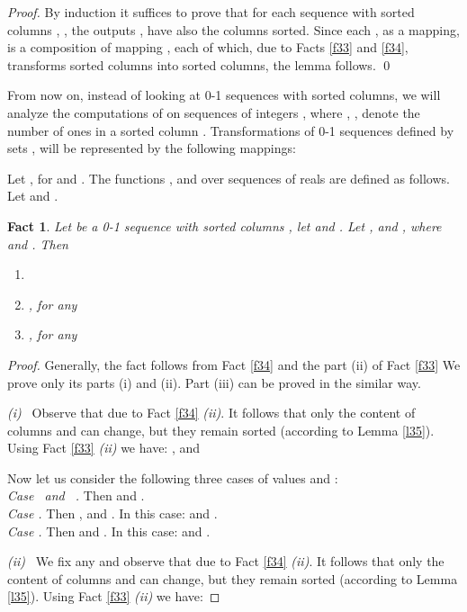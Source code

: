 \documentclass{llncs}
\newtheorem{fact}[theorem]{Fact}
\begin{document}
\begin{proof} By induction it suffices to prove that for each sequence
   with sorted columns , , the
  outputs ,  have also the columns sorted. Since
  each , as a mapping, is a composition of mapping , each of which, due to Facts 
  \ref{f33} and \ref{f34}, transforms sorted columns into sorted columns, the
  lemma follows. \qed
\end{proof}
From now on, instead of looking at 0-1 sequences with sorted columns, we
will analyze the computations of  on sequences of integers
, where , ,
denote the number of ones in a sorted column . Transformations of
0-1 sequences defined by sets ,  will be
represented by the following mappings:
\begin{definition} \label{defFun}
Let ,  for  and
. The functions ,  and  over
sequences of  reals are defined as follows. Let
 and .

\end{definition}
\begin{fact} \label{f6}
Let  be a 0-1 sequence with sorted columns , let  and . Let , 
  and , where
   and . Then
\begin{enumerate}
\item[(i)] 
\item[(ii)] , for any
  
\item[(iii)] , for any
  
\end{enumerate}
\end{fact}
\begin{proof} Generally, the fact follows from Fact \ref{f34} and the
  part (ii) of Fact \ref{f33} We prove only its parts (i) and (ii). Part
  (iii) can be proved in the similar way.

\textit{(i)~} Observe that 
  due to Fact \ref{f34} \textit{(ii)}. It follows that only the content
  of columns  and  can change, but they remain
  sorted (according to Lemma \ref{l35}). Using Fact
  \ref{f33} \textit{(ii)} we have: ,  and


Now let us consider the following three cases of values  and
: \\
\noindent
{\it Case  ~and~ .} Then 
   and 
  .\\
\noindent
{\it Case .} Then ,  and
. In this case:
   and 
  .\\
\noindent
{\it Case .} Then  and . In this case:
   and 
  .

\textit{(ii)~} We fix any  and observe
  that  due to Fact \ref{f34}
  \textit{(ii)}. It follows that only the content of columns 
  and  can change, but they remain sorted (according to
  Lemma \ref{l35}). Using Fact \ref{f33} \textit{(ii)} we have:


\end{proof}
\end{document}
